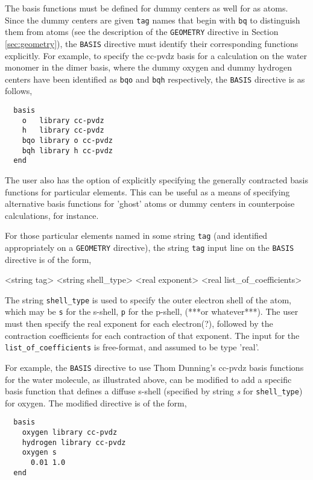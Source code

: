 The basis functions must be defined for dummy centers as well for
as atoms.  Since the dummy centers are given \verb+tag+ names that begin
with \verb+bq+ to distinguish them from atoms (see the description of the
\verb+GEOMETRY+ directive in Section \ref{sec:geometry}), the \verb+BASIS+
directive must identify their corresponding functions explicitly.  For
example, to specify the cc-pvdz basis for a calculation on the water 
monomer in the dimer basis, where the dummy oxygen and dummy hydrogen
centers have been identified as \verb+bqo+ and \verb+bqh+ respectively,
the \verb+BASIS+ directive is as follows,

\begin{verbatim}
  basis
    o   library cc-pvdz
    h   library cc-pvdz
    bqo library o cc-pvdz
    bqh library h cc-pvdz
  end
\end{verbatim}


The user also has the option of explicitly specifying the generally
contracted basis functions for particular elements.  This can be useful
as a means of specifying alternative basis functions for 'ghost' atoms
or dummy centers in counterpoise calculations, for instance.

For those particular elements named in some string \verb+tag+ (and identified
appropriately on a \verb+GEOMETRY+ directive), the string \verb+tag+ input 
line on the \verb+BASIS+ directive is of the form,

     <string tag> <string shell\_type>
        <real exponent> <real list\_of\_coefficients>

The string \verb+shell_type+ is used to specify the outer electron shell of
the atom, which may be \verb+s+ for the s-shell, \verb+p+ for the p-shell,
(***or whatever***).  The user must then specify the real exponent for
each electron(?), followed by the contraction coefficients for each 
contraction of that exponent.  The input for the \verb+list_of_coefficients+
is free-format, and assumed to be type 'real'.

For example, the \verb+BASIS+ directive to use Thom Dunning's cc-pvdz basis 
functions for the water molecule, as illustrated above, 
can be modified to add a specific basis function that defines a diffuse 
s-shell (specified by string {\em s} for \verb+shell_type+) for oxygen.
The modified directive is of the form,

\begin{verbatim}
  basis
    oxygen library cc-pvdz
    hydrogen library cc-pvdz
    oxygen s
      0.01 1.0
  end
\end{verbatim}

